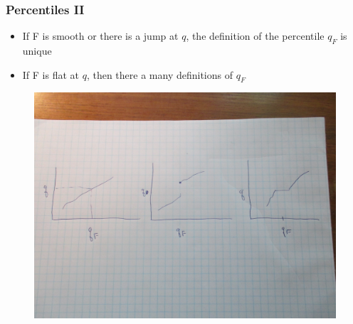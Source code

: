 \documentclass{beamer}
\begin{document}
\begin{frame}[shrink=2]
\frametitle{Percentiles II}
\begin{itemize} \vspace{5mm}

\item If F is smooth or there is a jump at $q$, the definition of the percentile $q_F$ is
unique \vspace{4mm}

\item If F is flat at $q$, then there a many definitions of $q_F$ \vspace{20mm}

\end{itemize}
\begin{figure}[h]
\begin{center}
    \includegraphics[scale = 0.15, bb = 800 220 800 400]{Figures/ThreeQuantileCases.pdf}
\end{center}
\end{figure}
\end{frame}
\end{document}
